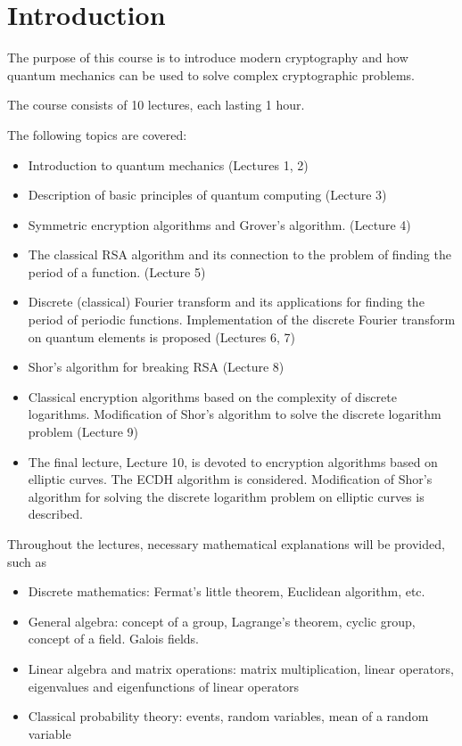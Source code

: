 \chapter*{Introduction}
The purpose of this course is to introduce modern cryptography and how quantum mechanics can be used to solve complex cryptographic problems.

The course consists of 10 lectures, each lasting 1 hour.

The following topics are covered:
\begin{itemize}
\item Introduction to quantum mechanics (Lectures 1, 2)
\item Description of basic principles of quantum computing (Lecture 3)
\item Symmetric encryption algorithms and Grover's algorithm. (Lecture 4)
\item The classical RSA algorithm and its connection to the problem of finding the period of a function. (Lecture 5)
\item Discrete (classical) Fourier transform and its applications for finding the period of periodic functions. Implementation of the discrete Fourier transform on quantum elements is proposed (Lectures 6, 7)
\item Shor's algorithm for breaking RSA (Lecture 8)
\item Classical encryption algorithms based on the complexity of discrete logarithms. Modification of Shor's algorithm to solve the discrete logarithm problem (Lecture 9)
\item The final lecture, Lecture 10, is devoted to encryption algorithms based on elliptic curves. The ECDH algorithm is considered. Modification of Shor's algorithm for solving the discrete logarithm problem on elliptic curves is described.
\end{itemize}

Throughout the lectures, necessary mathematical explanations will be provided, such as
\begin{itemize}
\item Discrete mathematics: Fermat's little theorem, Euclidean algorithm, etc.
\item General algebra: concept of a group, Lagrange's theorem, cyclic group, concept of a field. Galois fields.
\item Linear algebra and matrix operations: matrix multiplication, linear operators, eigenvalues and eigenfunctions of linear operators
\item Classical probability theory: events, random variables, mean of a random variable
\end{itemize}

